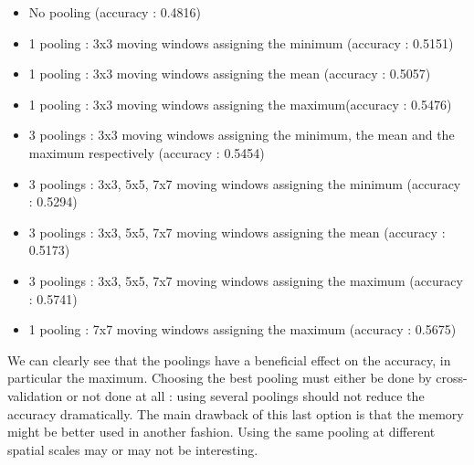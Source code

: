\documentclass[a4paper]{report}
\begin{document}
	\begin{itemize}
		\item No pooling (accuracy : 0.4816)
		\item 1 pooling : 3x3 moving windows assigning the minimum (accuracy : 0.5151)
		\item 1 pooling : 3x3 moving windows assigning the mean (accuracy : 0.5057)
		\item 1 pooling : 3x3 moving windows assigning the maximum(accuracy : 0.5476)
		\item 3 poolings : 3x3 moving windows assigning the minimum, the mean and the maximum respectively (accuracy : 0.5454)
		\item 3 poolings : 3x3, 5x5, 7x7 moving windows assigning the minimum (accuracy : 0.5294)
		\item 3 poolings : 3x3, 5x5, 7x7 moving windows assigning the mean (accuracy : 0.5173)
		\item 3 poolings : 3x3, 5x5, 7x7 moving windows assigning the maximum (accuracy : 0.5741)
		\item 1 pooling : 7x7 moving windows assigning the maximum (accuracy : 0.5675)
	\end{itemize}
	We can clearly see that the poolings have a beneficial effect on the accuracy, in particular the maximum. %
	Choosing the best pooling must either be done by cross-validation or not done at all : using several poolings should not reduce the accuracy dramatically. The main drawback of this last option is that the memory might be better used in another fashion. Using the same pooling at different spatial scales may or may not be interesting.

	
\end{document}
